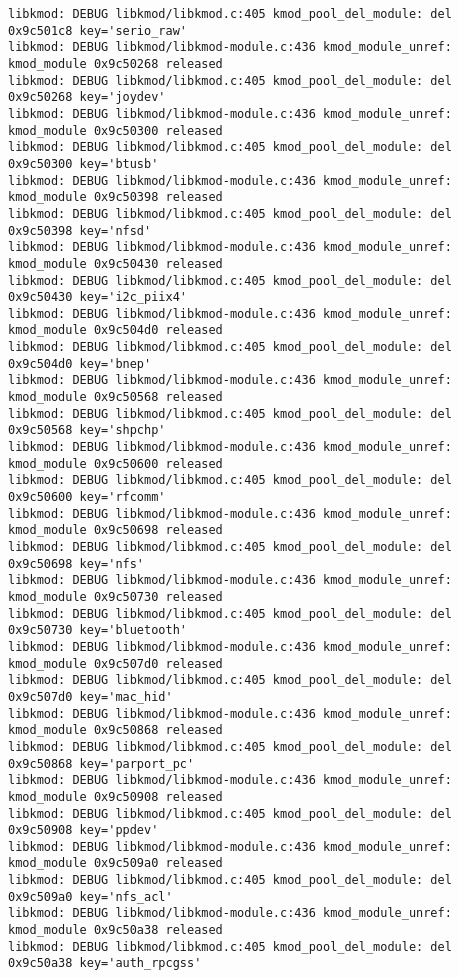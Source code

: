 \documentclass[11pt,a4paper]{article}
\begin{document}
{\begin{shaded}
\begin{verbatim}
libkmod: DEBUG libkmod/libkmod.c:405 kmod_pool_del_module: del 0x9c501c8 key='serio_raw'
libkmod: DEBUG libkmod/libkmod-module.c:436 kmod_module_unref: kmod_module 0x9c50268 released
libkmod: DEBUG libkmod/libkmod.c:405 kmod_pool_del_module: del 0x9c50268 key='joydev'
libkmod: DEBUG libkmod/libkmod-module.c:436 kmod_module_unref: kmod_module 0x9c50300 released
libkmod: DEBUG libkmod/libkmod.c:405 kmod_pool_del_module: del 0x9c50300 key='btusb'
libkmod: DEBUG libkmod/libkmod-module.c:436 kmod_module_unref: kmod_module 0x9c50398 released
libkmod: DEBUG libkmod/libkmod.c:405 kmod_pool_del_module: del 0x9c50398 key='nfsd'
libkmod: DEBUG libkmod/libkmod-module.c:436 kmod_module_unref: kmod_module 0x9c50430 released
libkmod: DEBUG libkmod/libkmod.c:405 kmod_pool_del_module: del 0x9c50430 key='i2c_piix4'
libkmod: DEBUG libkmod/libkmod-module.c:436 kmod_module_unref: kmod_module 0x9c504d0 released
libkmod: DEBUG libkmod/libkmod.c:405 kmod_pool_del_module: del 0x9c504d0 key='bnep'
libkmod: DEBUG libkmod/libkmod-module.c:436 kmod_module_unref: kmod_module 0x9c50568 released
libkmod: DEBUG libkmod/libkmod.c:405 kmod_pool_del_module: del 0x9c50568 key='shpchp'
libkmod: DEBUG libkmod/libkmod-module.c:436 kmod_module_unref: kmod_module 0x9c50600 released
libkmod: DEBUG libkmod/libkmod.c:405 kmod_pool_del_module: del 0x9c50600 key='rfcomm'
libkmod: DEBUG libkmod/libkmod-module.c:436 kmod_module_unref: kmod_module 0x9c50698 released
libkmod: DEBUG libkmod/libkmod.c:405 kmod_pool_del_module: del 0x9c50698 key='nfs'
libkmod: DEBUG libkmod/libkmod-module.c:436 kmod_module_unref: kmod_module 0x9c50730 released
libkmod: DEBUG libkmod/libkmod.c:405 kmod_pool_del_module: del 0x9c50730 key='bluetooth'
libkmod: DEBUG libkmod/libkmod-module.c:436 kmod_module_unref: kmod_module 0x9c507d0 released
libkmod: DEBUG libkmod/libkmod.c:405 kmod_pool_del_module: del 0x9c507d0 key='mac_hid'
libkmod: DEBUG libkmod/libkmod-module.c:436 kmod_module_unref: kmod_module 0x9c50868 released
libkmod: DEBUG libkmod/libkmod.c:405 kmod_pool_del_module: del 0x9c50868 key='parport_pc'
libkmod: DEBUG libkmod/libkmod-module.c:436 kmod_module_unref: kmod_module 0x9c50908 released
libkmod: DEBUG libkmod/libkmod.c:405 kmod_pool_del_module: del 0x9c50908 key='ppdev'
libkmod: DEBUG libkmod/libkmod-module.c:436 kmod_module_unref: kmod_module 0x9c509a0 released
libkmod: DEBUG libkmod/libkmod.c:405 kmod_pool_del_module: del 0x9c509a0 key='nfs_acl'
libkmod: DEBUG libkmod/libkmod-module.c:436 kmod_module_unref: kmod_module 0x9c50a38 released
libkmod: DEBUG libkmod/libkmod.c:405 kmod_pool_del_module: del 0x9c50a38 key='auth_rpcgss'

\end{verbatim}
\end{shaded}}
\end{document}
